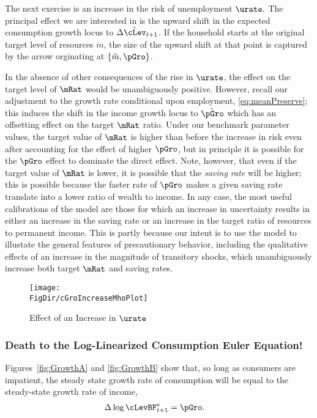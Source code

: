 \documentclass{\handout}
\begin{document}
The next exercise is an increase in the risk of unemployment $\urate.$
The principal effect we are interested in is the upward shift in the expected
consumption growth locus to $\Delta \grave{\cLev}_{t+1}$.  If the
household starts at the original target level of resources
$\grave{m}$, the size of the upward shift at that point is captured by the
arrow orginating at $\{\check{m},\pGro\}$.  

In the absence of other consequences of the rise in $\urate$, the
effect on the target level of $\mRat$ would be unambiguously positive.
However, recall our adjustment to the growth rate conditional upon
employment, \eqref{eq:meanPreserve}; this induces the shift in the
income growth locus to $\grave{\pGro}$ which has an offsetting effect
on the target $\mRat$ ratio.  Under our benchmark parameter values,
the target value of $\mRat$ is higher than before the increase in risk
even after accounting for the effect of higher $\pGro$, but in
principle it is possible for the $\pGro$ effect to dominate the direct
effect.  Note, however, that even if the target value of $\mRat$ is
lower, it is possible that the {\it saving rate} will be higher; this
is possible because the faster rate of $\pGro$ makes a given saving
rate translate into a lower ratio of wealth to income.  In any case,
the most useful calibrations of the model are those for
which an increase in uncertainty results in either an increase in the
saving rate or an increase in the target ratio of resources to
permanent income.  This is partly because our intent is to use the
model to illustate the general features of precautionary behavior,
including the qualitative effects of an increase in the magnitude of
transitory shocks, which unambiguously increase both target $\mRat$
and saving rates.

\begin{figure}
\caption{Effect of an Increase in $\urate$}
\texttt{[image: \\FigDir/cGroIncreaseMhoPlot]}
\label{fig:cGroIncreaseMhoPlot}
\end{figure}

\subsubsection{Death to the Log-Linearized Consumption Euler Equation!}

Figures~\ref{fig:GrowthA} and \ref{fig:GrowthB} show that, so long as
consumers are impatient, the steady state growth rate of consumption
will be equal to the steady-state growth rate of income,
\begin{equation}\begin{gathered}\begin{aligned}
        \Delta \log \cLevBF^{e}_{t+1} & =  \pGro. \label{eq:ceqg}
\end{aligned}\end{gathered}\end{equation}
\end{document}
